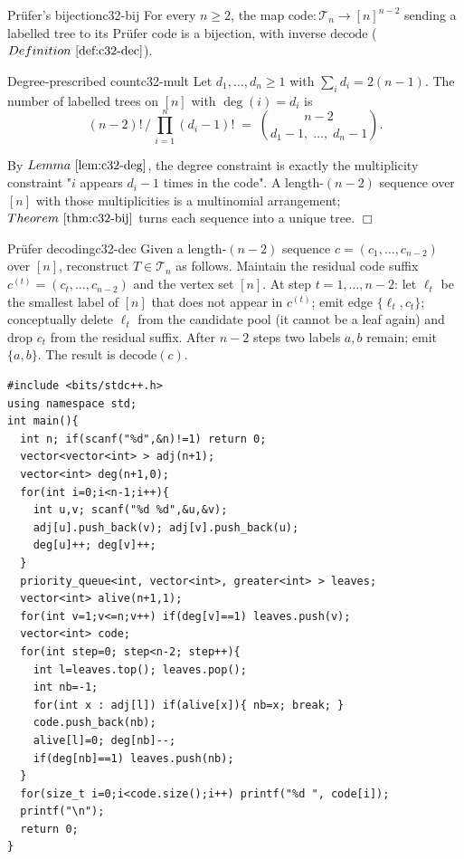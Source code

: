 \begin{theorem}{Pr\"ufer's bijection}{c32-bij}
For every \(n\ge 2\), the map \(\mathrm{code}:\mathcal{T}_n\to[n]^{n-2}\)
sending a labelled tree to its Pr\"ufer code is a bijection, with inverse
\(\mathrm{decode}\) (\(\defref{c32-dec}\)).
\end{theorem}

\begin{corollary}{Degree-prescribed count}{c32-mult}
Let \(d_1,\dots,d_n\ge 1\) with \(\sum_i d_i=2(n-1)\).  The number of
labelled trees on \([n]\) with \(\deg(i)=d_i\) is
\[
  (n-2)!\,\Big/\,\prod_{i=1}^{n} (d_i-1)! \;=\; \binom{n-2}{d_1-1,\;\dots,\;d_n-1} .
\]
\end{corollary}

\begin{proofbox}
By \(\lemref{c32-deg}\), the degree constraint is exactly the multiplicity
constraint "\(i\) appears \(d_i-1\) times in the code".  A length-\((n-2)\)
sequence over \([n]\) with those multiplicities is a multinomial arrangement;
\(\thmref{c32-bij}\) turns each sequence into a unique tree. \(\Box\)
\end{proofbox}

\begin{definition}{Pr\"ufer decoding}{c32-dec}
Given a length-\((n-2)\) sequence \(c=(c_1,\dots,c_{n-2})\) over \([n]\),
reconstruct \(T\in\mathcal{T}_n\) as follows.  Maintain the residual code
suffix \(c^{(t)}=(c_t,\dots,c_{n-2})\) and the vertex set \([n]\).  At step
\(t=1,\dots,n-2\): let \(\ell_t\) be the smallest label of \([n]\) that does
not appear in \(c^{(t)}\); emit edge \(\{\ell_t,c_t\}\); conceptually delete
\(\ell_t\) from the candidate pool (it cannot be a leaf again) and drop \(c_t\)
from the residual suffix.  After \(n-2\) steps two labels \(a,b\) remain; emit
\(\{a,b\}\).  The result is \(\mathrm{decode}(c)\).
\end{definition}

\begin{lstlisting}[caption={Pruefer encode. Maintain a min-heap of current leaves and a degree array; pop the smallest leaf, write its live neighbour, decrement that neighbour, and push it if it becomes a leaf. ASCII only, identifiers without underscores}, label={lst:c32-encode}]
#include <bits/stdc++.h>
using namespace std;
int main(){
  int n; if(scanf("%d",&n)!=1) return 0;
  vector<vector<int> > adj(n+1);
  vector<int> deg(n+1,0);
  for(int i=0;i<n-1;i++){
    int u,v; scanf("%d %d",&u,&v);
    adj[u].push_back(v); adj[v].push_back(u);
    deg[u]++; deg[v]++;
  }
  priority_queue<int, vector<int>, greater<int> > leaves;
  vector<int> alive(n+1,1);
  for(int v=1;v<=n;v++) if(deg[v]==1) leaves.push(v);
  vector<int> code;
  for(int step=0; step<n-2; step++){
    int l=leaves.top(); leaves.pop();
    int nb=-1;
    for(int x : adj[l]) if(alive[x]){ nb=x; break; }
    code.push_back(nb);
    alive[l]=0; deg[nb]--;
    if(deg[nb]==1) leaves.push(nb);
  }
  for(size_t i=0;i<code.size();i++) printf("%d ", code[i]);
  printf("\n");
  return 0;
}
\end{lstlisting}

